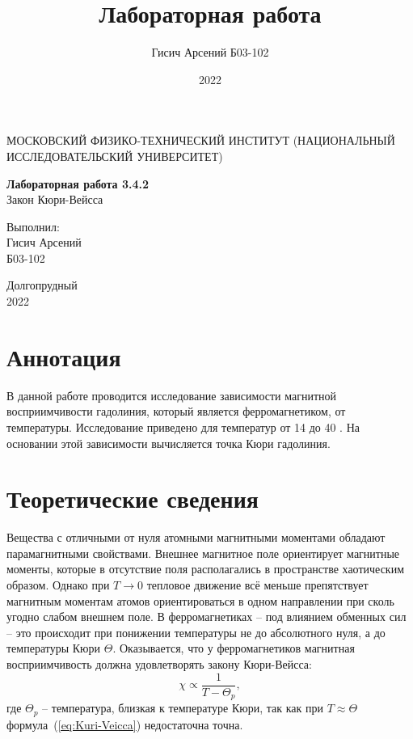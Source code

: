 \documentclass[a4paper, 12pt]{article}
\title{Лабораторная работа}
\author{Гисич Арсений Б03-102}
\date{2022}
\begin{document}
	\begin{center}
		{\large МОСКОВСКИЙ ФИЗИКО-ТЕХНИЧЕСКИЙ ИНСТИТУТ (НАЦИОНАЛЬНЫЙ ИССЛЕДОВАТЕЛЬСКИЙ УНИВЕРСИТЕТ)}
	\end{center}
	\vspace{5 cm}
	{\Large
		\begin{center}
			{\bf Лабораторная работа 3.4.2}\\[0.2 cm]
			Закон Кюри-Вейсса
		\end{center}
	}
	\vspace{4 cm}
	\begin{flushright}
		{\Large Выполнил: \\
			\vspace{0.2 cm}
			Гисич Арсений \\
			\vspace{0.2 cm}
			Б03-102 \\}
	\end{flushright}
	\vspace{9 cm}
	\begin{center}
		Долгопрудный\\[0.1 cm]
		2022
	\end{center}
\thispagestyle{empty}

\section{Аннотация}

В данной работе проводится исследование зависимости магнитной восприимчивости гадолиния, который является ферромагнетиком, от температуры. Исследование приведено для температур от 14 до 40 \textcelsius. На основании этой зависимости вычисляется точка Кюри гадолиния.

\section{Теоретические сведения}

Вещества с отличными от нуля атомными магнитными моментами обладают парамагнитными свойствами. Внешнее магнитное поле ориентирует магнитные моменты, которые в отсутствие поля располагались в пространстве хаотическим образом. Однако при $T \rightarrow 0$ тепловое движение всё меньше препятствует магнитным моментам атомов ориентироваться в одном направлении при сколь угодно слабом внешнем поле. В ферромагнетиках -- под влиянием обменных сил -- это происходит при понижении температуры не до абсолютного нуля, а до температуры Кюри $\Theta$. Оказывается, что у ферромагнетиков магнитная восприимчивость должна удовлетворять закону Кюри-Вейсса:
\begin{equation}
	\label{eq:Kuri-Veicca}
	\chi \propto \frac{1}{T-\Theta_p},
\end{equation}
где $\Theta_p$ -- температура, близкая к температуре Кюри, так как при $T \approx \Theta$ формула~(\ref{eq:Kuri-Veicca}) недостаточна точна.
\end{document}
